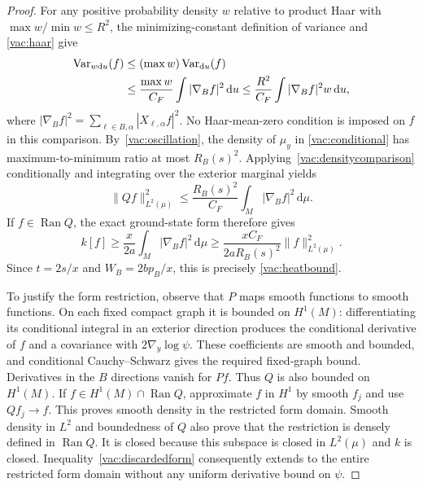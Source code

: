 \begin{proof}
For any positive probability density $w$ relative to product Haar with
$\max w/\min w\leq R^2$, the minimizing-constant definition of variance and
\eqref{vac:haar} give
\begin{align}
 \operatorname{Var}_{w\mathrm du}(f)
 &\leq (\max w)\operatorname{Var}_{\mathrm du}(f)\notag\\
 &\leq\frac{\max w}{C_F}\int|\nabla_Bf|^2\,\mathrm du
 \leq\frac{R^2}{C_F}\int|\nabla_Bf|^2w\,\mathrm du,
 \label{vac:densitycomparison}
\end{align}
where $|\nabla_Bf|^2=\sum_{\ell\in B,\alpha}|X_{\ell,\alpha}f|^2$.
No Haar-mean-zero condition is imposed on $f$ in this comparison.
By~\eqref{vac:oscillation}, the density of $\mu_y$ in
\eqref{vac:conditional} has maximum-to-minimum ratio at most $R_B(s)^2$.
Applying~\eqref{vac:densitycomparison} conditionally and integrating over
the exterior marginal yields
\begin{equation}
 \|Qf\|_{L^2(\mu)}^2
 \leq\frac{R_B(s)^2}{C_F}
        \int_M|\nabla_Bf|^2\,\mathrm d\mu.
 \label{vac:conditionalpoincare}
\end{equation}
If $f\in\operatorname{Ran}Q$, the exact ground-state form therefore gives
\begin{equation}
 k[f]\geq\frac{x}{2a}\int_M|\nabla_Bf|^2\,\mathrm d\mu
       \geq\frac{xC_F}{2aR_B(s)^2}\|f\|_{L^2(\mu)}^2.
 \label{vac:discardedform}
\end{equation}
Since $t=2s/x$ and $W_B=2bp_B/x$, this is precisely
\eqref{vac:heatbound}.

To justify the form restriction, observe that $P$ maps smooth functions to
smooth functions.  On each fixed compact graph it is bounded on $H^1(M)$:
differentiating its conditional integral in an exterior direction produces
the conditional derivative of $f$ and a covariance with
$2\nabla_y\log\psi$.  These coefficients are smooth and bounded, and
conditional Cauchy--Schwarz gives the required fixed-graph bound.  Derivatives
in the $B$ directions vanish for $Pf$.  Thus $Q$ is also bounded on
$H^1(M)$.  If $f\in H^1(M)\cap\operatorname{Ran}Q$, approximate $f$ in
$H^1$ by smooth $f_j$ and use $Qf_j\to f$.  This proves smooth density in
the restricted form domain.  Smooth density in $L^2$ and boundedness of $Q$
also prove that the restriction is densely defined in
$\operatorname{Ran}Q$.  It is closed because this subspace is closed in
$L^2(\mu)$ and $k$ is closed.  Inequality~\eqref{vac:discardedform} consequently
extends to the entire restricted form domain without any uniform derivative
bound on $\psi$.


\end{proof}
